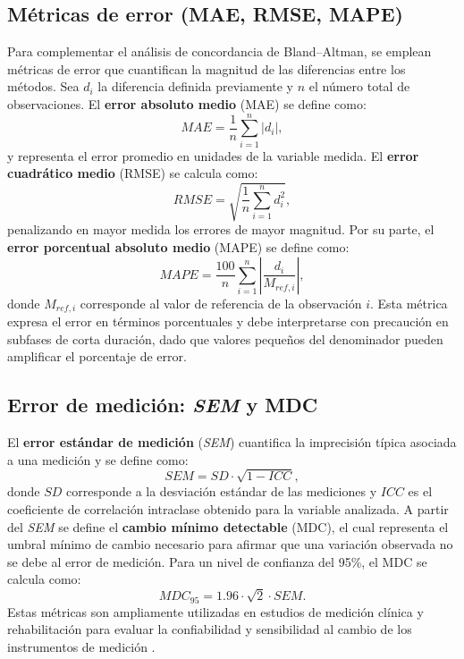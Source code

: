 \documentclass[12pt]{report}
\begin{document}
\begin{justify}
    \subsection{Métricas de error (MAE, RMSE, MAPE)}
    Para complementar el análisis de concordancia de Bland--Altman, se emplean
    métricas de error que cuantifican la magnitud de las diferencias entre los
    métodos. Sea $d_{i}$ la diferencia definida previamente y $n$ el número total de
    observaciones. El \textbf{error absoluto medio} (MAE) se define como:
    \[
        MAE = \frac{1}{n}\sum_{i=1}^{n} |d_{i}|,
    \]
    y representa el error promedio en unidades de la variable medida. El \textbf{error
        cuadrático medio} (RMSE) se calcula como:
    \[
        RMSE = \sqrt{\frac{1}{n}\sum_{i=1}^{n} d_{i}^{2}},
    \]
    penalizando en mayor medida los errores de mayor magnitud. Por su parte, el \textbf{error
        porcentual absoluto medio} (MAPE) se define como:
    \[
        MAPE = \frac{100}{n}\sum_{i=1}^{n} \left|\frac{d_{i}}{M_{ref,i}}\right|,
    \]
    donde $M_{ref,i}$ corresponde al valor de referencia de la observación $i$. Esta
    métrica expresa el error en términos porcentuales y debe interpretarse con
    precaución en subfases de corta duración, dado que valores pequeños del denominador
    pueden amplificar el porcentaje de error.

    \subsection{Error de medición: \textit{SEM} y MDC}
    El \textbf{error estándar de medición} (\textit{SEM}) cuantifica la imprecisión típica
    asociada a una medición y se define como:
    \[
        SEM = SD \cdot \sqrt{1 - \textit{ICC}},
    \]
    donde $SD$ corresponde a la desviación estándar de las mediciones y
    $\textit{ICC}$ es el coeficiente de correlación intraclase obtenido para la
    variable analizada. A partir del \textit{SEM} se define el \textbf{cambio mínimo
        detectable} (MDC), el cual representa el umbral mínimo de cambio necesario para
    afirmar que una variación observada no se debe al error de medición. Para un nivel
    de confianza del 95\%, el MDC se calcula como:
    \[
        MDC_{95}= 1.96 \cdot \sqrt{2}\cdot SEM.
    \]
    Estas métricas son ampliamente utilizadas en estudios de medición clínica y
    rehabilitación para evaluar la confiabilidad y sensibilidad al cambio de los
    instrumentos de medición \cite{Weir2005}.

    \clearpage


\end{justify}
\end{document}

